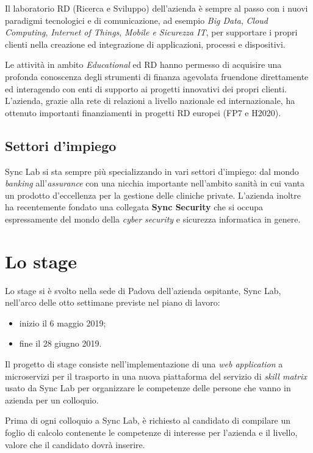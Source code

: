 Il laboratorio RD (Ricerca e Sviluppo) dell'azienda è sempre al passo con i nuovi
paradigmi tecnologici e di comunicazione, ad esempio \textit{Big Data}, \textit{Cloud Computing},
\textit{Internet of Things}, \textit{Mobile e Sicurezza IT}, per supportare i propri clienti nella creazione
ed integrazione di applicazioni, processi e dispositivi.

Le attività in ambito \textit{Educational} ed RD hanno permesso di acquisire una profonda
conoscenza degli strumenti di finanza agevolata fruendone direttamente ed interagendo
con enti di supporto ai progetti innovativi dei propri clienti. L'azienda, grazie alla rete
di relazioni a livello nazionale ed internazionale, ha ottenuto importanti finanziamenti
in progetti RD europei (FP7 e H2020).

\subsection{Settori d'impiego}

Sync Lab si sta sempre più specializzando in vari settori d'impiego: dal mondo \textit{banking}
all'\textit{assurance} con una nicchia importante nell'ambito sanità in cui vanta un prodotto
d'eccellenza per la gestione delle cliniche private.
L'azienda inoltre ha recentemente fondato una collegata \textbf{Sync Security} che si occupa
espressamente del mondo della \textit{cyber security} e sicurezza informatica in genere.

\section{Lo stage}

Lo stage si è svolto nella sede di Padova dell'azienda ospitante, Sync Lab, nell'arco delle otto settimane previste nel piano di lavoro:
\begin{itemize}
	\item inizio il 6 maggio 2019;
	\item fine il 28 giugno 2019.
\end{itemize}
Il progetto di stage consiste nell'implementazione di una \textit{web application} a microservizi per il trasporto in una nuova piattaforma del servizio di \textit{skill matrix} usato da Sync Lab per organizzare le competenze delle persone che vanno in azienda per un colloquio.

Prima di ogni colloquio a Sync Lab, è richiesto al candidato di compilare un foglio di calcolo contenente le competenze di interesse
per l'azienda e il livello, valore che il candidato dovrà inserire.

